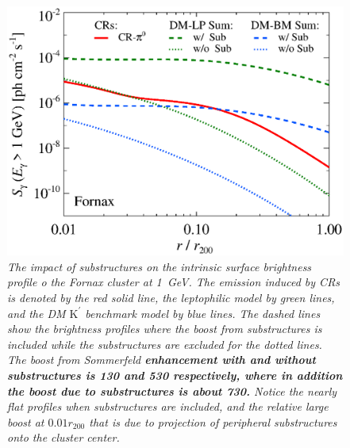 \documentclass[10pt,aps,pra,reprint,amsmath,amsfonts,amssymb,showpacs,nofootinbib,floatfix]{revtex4-1}
\def\C#1{{\bf #1}}
\newcommand{\rmn}{\mathrm}
\newcommand{\Kp}{\rmn{K}^\prime}
\newcommand{\rvir}{r_{200}}
\begin{document}
\begin{figure}%
 \includegraphics[width=0.99\columnwidth]{figures/SB.resolved.v13.1GeV.SF700.noSuB.vs.SubMass.elmu.eps}
 \caption{\it The impact of substructures on the intrinsic surface
   brightness profile o the Fornax cluster at 1~GeV. The emission
   induced by CRs is denoted by the red solid line, the leptophilic
   model by green lines, and the DM $\Kp$ benchmark model by blue
   lines. The dashed lines show the brightness profiles where the
   boost from substructures is included while the substructures are
   excluded for the dotted lines. The boost from Sommerfeld
   \C{enhancement with and without substructures is 130 and 530
     respectively, where in addition the boost due to substructures is
     about 730.} Notice the nearly flat profiles when substructures
   are included, and the relative large boost at $0.01\rvir$ that is
   due to projection of peripheral substructures onto the cluster
   center.}
 \label{fig:SB_sub}
\end{figure}
\end{document}
